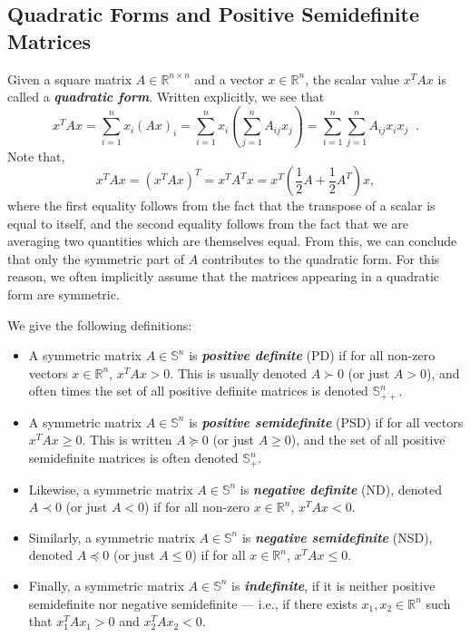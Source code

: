 \documentclass[12pt]{article}
\begin{document}
\subsection{Quadratic Forms and Positive Semidefinite Matrices}
Given a square matrix $A \in \mathbb{R}^{n \times n}$ and a vector $x
\in \mathbb{R}^n$, the scalar value $x^T A x$ is called a
\textbf{\textit{quadratic form}}.  Written explicitly, we see that
\[x^T A x = \sum_{i=1}^n x_i (Ax)_i = \sum_{i=1}^n x_i \left(\sum_{j=1}^n A_{ij} x_j\right) = \sum_{i=1}^n \sum_{j=1}^n A_{ij} x_i x_j\;\;.\]
Note that,
\[x^T A x = (x^T A x)^T = x^T A^T x = x^T\left(\frac{1}{2} A +
\frac{1}{2}A^T\right)x,\]
where the first equality follows from the fact that the transpose
of a scalar is equal to itself, and the second equality follows
from the fact that we are averaging two quantities which are themselves equal.
From this, we can conclude that 
only the symmetric part of $A$ contributes to the quadratic
form.  For this reason, we often implicitly assume that the matrices
appearing in a quadratic form are symmetric.

We give the following definitions:
\begin{itemize}
\item A symmetric matrix $A \in \mathbb{S}^n$ is
\textbf{\textit{positive definite}} (PD) if for all non-zero
vectors $x \in \mathbb{R}^n$, $x^T A x > 0$.  This is usually
denoted $A \succ 0$ (or just $A > 0$), and often times the set of
all positive definite matrices is denoted $\mathbb{S}^n_{++}$. 
  

\item A symmetric matrix $A \in \mathbb{S}^n$ is
\textbf{\textit{positive semidefinite}} (PSD) if for all vectors
$x^T A x \geq 0$.  This is written $A \succeq 0$ (or just $A \geq
0$), and the set of all positive semidefinite matrices is often
denoted $\mathbb{S}^n_+$.

\item Likewise, a symmetric matrix $A \in
\mathbb{S}^n$ is \textbf{\textit{negative definite}} (ND), denoted $A
\prec 0$ (or just $A < 0$) if for all non-zero $x \in
\mathbb{R}^n$, $x^T A x < 0$.

\item Similarly, a symmetric matrix $A \in \mathbb{S}^n$ is
    \textbf{\textit{negative semidefinite}} (NSD), denoted $A \preceq
    0$ (or just $A \leq 0$) if for all $x \in \mathbb{R}^n$, $x^T A x 
\leq 0$.

\item Finally, a symmetric matrix $A \in
\mathbb{S}^n$ is \textbf{\textit{indefinite}}, if it is neither
positive semidefinite nor negative semidefinite --- i.e., if there
exists $x_1, x_2 \in \mathbb{R}^n$ such that $x_1^T A x_1 > 0$ and
$x_2^T A x_2 < 0$.

\end{itemize}
\end{document}
